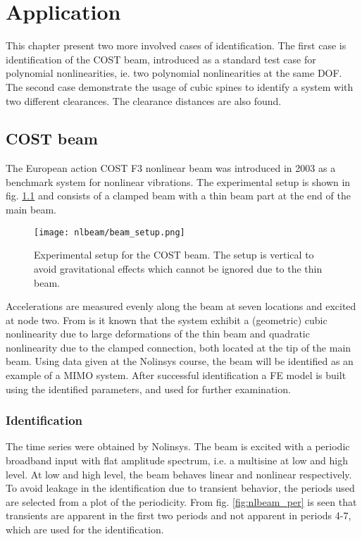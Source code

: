 
\chapter{Application}
\label{cha:application}

This chapter present two more involved cases of identification. The first case
is identification of the COST beam, introduced as a standard test case for
polynomial nonlinearities, ie. two polynomial nonlinearities at the same DOF.
The second case demonstrate the usage of cubic spines to identify a system with
two different clearances. The clearance distances are also found.


\section{COST beam}
\label{sec:cost-beam}

The European action COST F3 nonlinear beam \autocite{GOLINVAL2003} was
introduced in 2003 as a benchmark system for nonlinear vibrations. The
experimental setup is shown in fig. \ref{fig:beam_setup} and consists of a
clamped beam with a thin beam part at the end of the main beam.

\begin{figure}[!ht]
  \centering
  \texttt{[image: nlbeam/beam\_setup.png]}
  \caption{Experimental setup for the COST beam. The setup is vertical to avoid
    gravitational effects which cannot be ignored due to the thin beam.}
  \label{fig:beam_setup}
\end{figure}


Accelerations are measured evenly along the beam at seven locations and excited
at node two.
From \textcite{lenaerts2003a} is it known that the system exhibit a (geometric)
cubic nonlinearity due to large deformations of the thin beam and quadratic
nonlinearity due to the clamped connection, both located at the tip of the main
beam. Using data given at the Nolinsys course, the beam will be identified as an
example of a MIMO system. After successful identification a FE model is built
using the identified parameters, and used for further examination.


\subsection{Identification}

The time series were obtained by Nolinsys. The beam is excited with a periodic
broadband input with flat amplitude spectrum, i.e. a multisine at low and high
level. At low and high level, the beam behaves linear and nonlinear
respectively. To avoid leakage in the identification due to transient behavior,
the periods used are selected from a plot of the periodicity. From fig.
\ref{fig:nlbeam_per} is seen that transients are apparent in the first two
periods and not apparent in periods 4-7, which are used for the identification.

